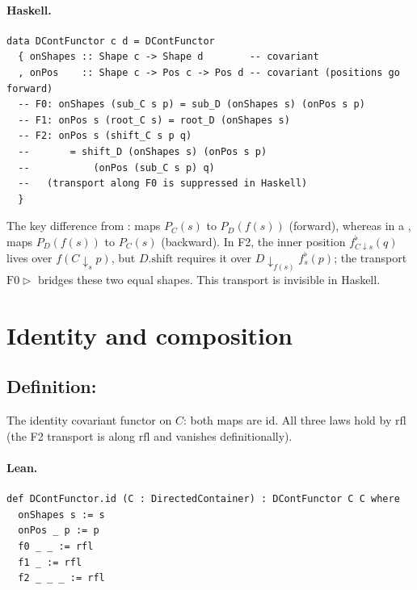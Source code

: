 \documentclass[11pt,a4paper]{article}
\begin{document}
\paragraph{Haskell.}
\begin{lstlisting}[style=haskell]
data DContFunctor c d = DContFunctor
  { onShapes :: Shape c -> Shape d        -- covariant
  , onPos    :: Shape c -> Pos c -> Pos d -- covariant (positions go forward)
  -- F0: onShapes (sub_C s p) = sub_D (onShapes s) (onPos s p)
  -- F1: onPos s (root_C s) = root_D (onShapes s)
  -- F2: onPos s (shift_C s p q)
  --       = shift_D (onShapes s) (onPos s p)
  --           (onPos (sub_C s p) q)
  --   (transport along F0 is suppressed in Haskell)
  }
\end{lstlisting}

\begin{fidelitynote}
The key difference from :  maps $P_C(s)$ to
$P_D(f(s))$ (forward), whereas in a ,  maps
$P_D(f(s))$ to $P_C(s)$ (backward).  In F2, the inner position
$f^\flat_{C \downarrow s}(q)$ lives over $f(C \!\downarrow_s\! p)$, but
$D.\mathrm{shift}$ requires it over $D \!\downarrow_{f(s)}\! f^\flat_s(p)$;
the transport $\mathrm{F0} \triangleright$ bridges these two equal shapes.
This transport is invisible in Haskell.
\end{fidelitynote}


\section{Identity and composition}

\subsection{Definition: }

\begin{defn}
The identity covariant functor on $C$: both maps are $\mathrm{id}$.
All three laws hold by $\mathrm{rfl}$ (the F2 transport is along $\mathrm{rfl}$
and vanishes definitionally).
\end{defn}

\paragraph{Lean.}
\begin{lstlisting}[style=lean]
def DContFunctor.id (C : DirectedContainer) : DContFunctor C C where
  onShapes s := s
  onPos _ p := p
  f0 _ _ := rfl
  f1 _ := rfl
  f2 _ _ _ := rfl
\end{lstlisting}
\end{document}
